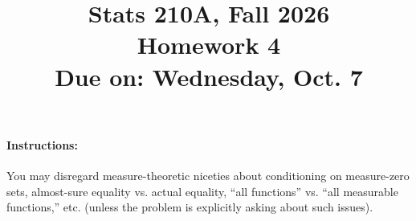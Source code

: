 \documentclass{article}
\theoremstyle{definition}
\begin{document}
\title{Stats 210A, Fall 2026\\
  Homework 4 \\
  {\large {\bf Due on}: Wednesday, Oct. 7}}
\date{}

\maketitle

\paragraph{Instructions:} You may disregard measure-theoretic niceties about conditioning on measure-zero sets, almost-sure equality vs. actual equality, ``all functions'' vs. ``all measurable functions,'' etc. (unless the problem is explicitly asking about such issues).
\end{document}
